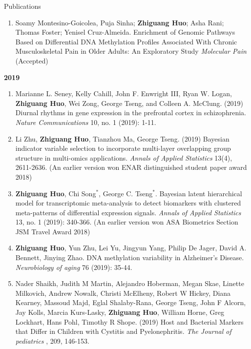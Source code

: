 \documentclass{resume} %
\begin{document}
\begin{rSection}{Publications}
\begin{enumerate}[noitemsep,topsep=0pt]
\item
Soamy Montesino-Goicolea, Puja Sinha; {\bf Zhiguang Huo}; Asha Rani; Thomas Foster; Yenisel Cruz-Almeida. 
Enrichment of Genomic Pathways Based on Differential DNA Methylation Profiles Associated With Chronic Musculoskeletal Pain in Older Adults: An Exploratory Study
\emph{Molecular Pain} (Accepted)


\end{enumerate}


\textbf{2019}
\begin{enumerate}[noitemsep,topsep=0pt,resume]



\item Marianne L. Seney, Kelly Cahill, John F. Enwright III, Ryan W. Logan, {\bf  Zhiguang Huo}, Wei Zong, George Tseng, and Colleen A. McClung. (2019) Diurnal rhythms in gene expression in the prefrontal cortex in schizophrenia. \emph{Nature Communications} 10, no. 1 (2019): 1-11.


\item Li Zhu, {\bf  Zhiguang Huo}, Tianzhou Ma, George Tseng. (2019)
Bayesian indicator variable selection to incorporate multi-layer overlapping group structure in multi-omics applications. 
\emph{Annals of Applied Statistics} 13(4), 2611-2636. 
(An earlier version won ENAR distinguished student paper award 2018)



\item 
{\bf Zhiguang Huo}, Chi Song$^*$, George C. Tseng$^*$. 
Bayesian latent hierarchical model for transcriptomic meta-analysis to detect biomarkers with clustered meta-patterns of differential expression signals. \emph{Annals of Applied Statistics} 13, no. 1 (2019): 340-366. (An earlier version won ASA Biometrics Section JSM Travel Award 2018)


\item 
{\bf Zhiguang Huo}, Yun Zhu, Lei Yu, Jingyun Yang, Philip De Jager, David A. Bennett, Jinying Zhao.
 DNA methylation variability in Alzheimer's Disease. \emph{Neurobiology of aging} 76 (2019): 35-44.


\item  
Nader Shaikh, Judith M Martin, Alejandro Hoberman, Megan Skae, Linette Milkovich, Andrew Nowalk, Christi McElheny, Robert W Hickey, Diana Kearney, Massoud Majd, Eglal Shalaby-Rana, George Tseng, John F Alcorn, Jay Kolls, Marcia Kurs-Lasky, {\bf Zhiguang Huo}, William Horne, Greg Lockhart, Hans Pohl, Timothy R Shope. 
(2019)
Host and Bacterial Markers that Differ in Children with Cystitis and Pyelonephritis. \emph{The Journal of pediatrics} , 209, 146-153.



\end{enumerate}
\end{rSection}
\end{document}
